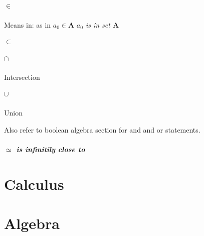 \documentclass[12pt, a4paper,oneside]{book}
\begin{document}
\paragraph{\(\in\)}
\begin{paragraph}
Means in: as in \(a_0 \in \mathbf{A}\) \textit{\(a_0\) is in set \(\mathbf{A}\)} 
\end{paragraph}
\paragraph {\(\subset\)}
\paragraph{\(\cap\)}
\begin{paragraph}
Intersection
\end{paragraph}
\paragraph{\(\cup\)}
\begin{paragraph}
Union
\end{paragraph}
Also refer to boolean algebra section for and and or statements.
\paragraph{\(\simeq\) is infinitily close to }
\chapter{Calculus}
\chapter{Algebra}
\end{document}
